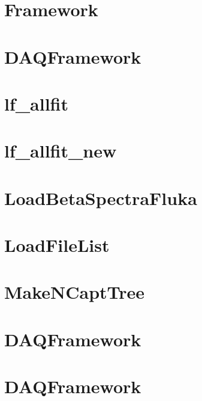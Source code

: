 \let\mypdfximage\pdfximage\def\pdfximage{\immediate\mypdfximage}\documentclass[twoside]{book}
\newcommand{\+}{\discretionary{\mbox{\scriptsize$\hookleftarrow$}}{}{}}
\begin{document}
\chapter{Framework}
\label{md_UserTools_ImportedTools_README}

\chapter{DAQFramework}
\label{md_UserTools_InactiveTools_README}

\chapter{lf\+\_\+allfit}
\label{md_UserTools_lf_allfit_README}

\chapter{lf\+\_\+allfit\+\_\+new}
\label{md_UserTools_lf_allfit_new_README}

\chapter{Load\+Beta\+Spectra\+Fluka}
\label{md_UserTools_LoadBetaSpectraFluka_README}

\chapter{Load\+File\+List}
\label{md_UserTools_LoadFileList_README}

\chapter{Make\+NCapt\+Tree}
\label{md_UserTools_MakeNCaptTree_README}

\chapter{DAQFramework}
\label{md_UserTools_NCaptInfo_README}

\chapter{DAQFramework}
\label{md_UserTools_ntag_BDT_README}

\end{document}
